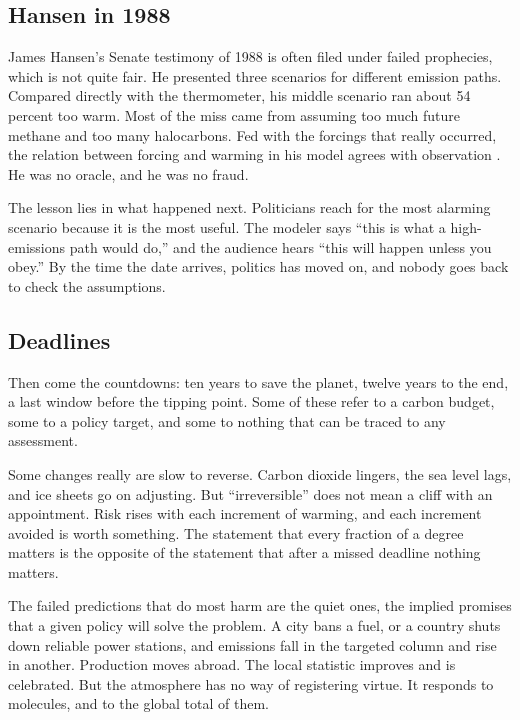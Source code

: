 \documentclass[12pt,a4paper]{book}
\begin{document}
\subsection{Hansen in 1988}

James Hansen's Senate testimony of 1988 is often filed under failed prophecies, which is not quite fair. He presented three scenarios for different emission paths. Compared directly with the thermometer, his middle scenario ran about 54 percent too warm. Most of the miss came from assuming too much future methane and too many halocarbons. Fed with the forcings that really occurred, the relation between forcing and warming in his model agrees with observation \cite{Hausfather2020}. He was no oracle, and he was no fraud.

The lesson lies in what happened next. Politicians reach for the most alarming scenario because it is the most useful. The modeler says ``this is what a high-emissions path would do,'' and the audience hears ``this will happen unless you obey.'' By the time the date arrives, politics has moved on, and nobody goes back to check the assumptions.

\subsection{Deadlines}

Then come the countdowns: ten years to save the planet, twelve years to the end, a last window before the tipping point. Some of these refer to a carbon budget, some to a policy target, and some to nothing that can be traced to any assessment.

Some changes really are slow to reverse. Carbon dioxide lingers, the sea level lags, and ice sheets go on adjusting. But ``irreversible'' does not mean a cliff with an appointment. Risk rises with each increment of warming, and each increment avoided is worth something. The statement that every fraction of a degree matters is the opposite of the statement that after a missed deadline nothing matters.

The failed predictions that do most harm are the quiet ones, the implied promises that a given policy will solve the problem. A city bans a fuel, or a country shuts down reliable power stations, and emissions fall in the targeted column and rise in another. Production moves abroad. The local statistic improves and is celebrated. But the atmosphere has no way of registering virtue. It responds to molecules, and to the global total of them.
\end{document}
